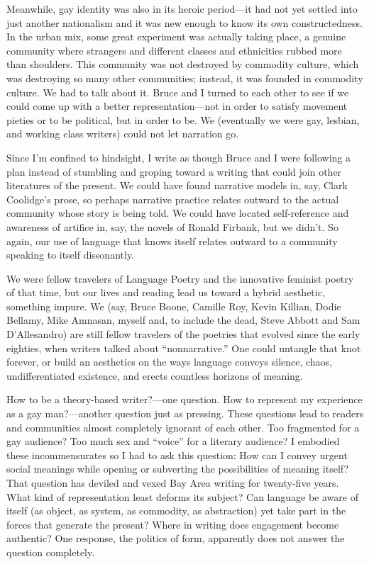 \documentclass[
]{memoir}
\begin{document}
Meanwhile, gay identity was also in its heroic period---it had not yet
settled into just another nationalism and it was new enough to know its
own constructedness. In the urban mix, some great experiment was
actually taking place, a genuine community where strangers and different
classes and ethnicities rubbed more than shoulders. This community was
not destroyed by commodity culture, which was destroying so many other
communities; instead, it was founded in commodity culture. We had to
talk about it. Bruce and I turned to each other to see if we could come
up with a better representation---not in order to satisfy movement
pieties or to be political, but in order to be. We (eventually we were
gay, lesbian, and working class writers) could not let narration go.

Since I'm confined to hindsight, I write as though Bruce and I were
following a plan instead of stumbling and groping toward a writing that
could join other literatures of the present. We could have found
narrative models in, say, Clark Coolidge's prose, so perhaps narrative
practice relates outward to the actual community whose story is being
told. We could have located self-reference and awareness of artifice in,
say, the novels of Ronald Firbank, but we didn't. So again, our use of
language that knows itself relates outward to a community speaking to
itself dissonantly.

We were fellow travelers of Language Poetry and the innovative feminist
poetry of that time, but our lives and reading lead us toward a hybrid
aesthetic, something impure. We (say, Bruce Boone, Camille Roy, Kevin
Killian, Dodie Bellamy, Mike Amnasan, myself and, to include the dead,
Steve Abbott and Sam D'Allesandro) are still fellow travelers of the
poetries that evolved since the early eighties, when writers talked
about ``nonnarrative.'' One could untangle that knot forever, or build
an aesthetics on the ways language conveys silence, chaos,
undifferentiated existence, and erects countless horizons of meaning.

How to be a theory-based writer?---one question. How to represent my
experience as a gay man?---another question just as pressing. These
questions lead to readers and communities almost completely ignorant of
each other. Too fragmented for a gay audience? Too much sex and
``voice'' for a literary audience? I embodied these incommensurates so I
had to ask this question: How can I convey urgent social meanings while
opening or subverting the possibilities of meaning itself? That question
has deviled and vexed Bay Area writing for twenty-five years. What kind
of representation least deforms its subject? Can language be aware of
itself (as object, as system, as commodity, as abstraction) yet take
part in the forces that generate the present? Where in writing does
engagement become authentic? One response, the politics of form,
apparently does not answer the question completely.
\end{document}
